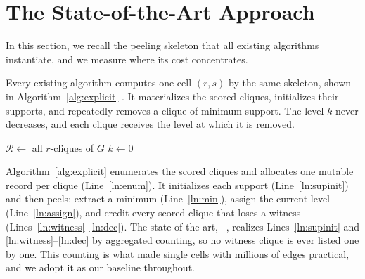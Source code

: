 \section{The State-of-the-Art Approach}\label{sec:existing}
In this section, we recall the peeling skeleton that all existing algorithms instantiate, and we measure where its cost concentrates.

Every existing algorithm computes one cell $(r,s)$ by the same skeleton, shown in Algorithm~\ref{alg:explicit} \cite{firstNucleus,NuclearCD}.
%
It materializes the scored cliques, initializes their supports, and repeatedly removes a clique of minimum support.
%
The level $k$ never decreases, and each clique receives the level at which it is removed.

\begin{algorithm}[t]
\caption{The explicit peel of existing algorithms.}
\label{alg:explicit}
\algfontsize
{}
$\mathcal{R} \leftarrow$ all $r$-cliques of $G$\label{ln:enum}
$k \leftarrow 0$\;
\end{algorithm}

Algorithm~\ref{alg:explicit} enumerates the scored cliques and allocates one mutable record per clique (Line~\ref{ln:enum}).
%
It initializes each support (Line~\ref{ln:supinit}) and then peels: extract a minimum (Line~\ref{ln:min}), assign the current level (Line~\ref{ln:assign}), and credit every scored clique that loses a witness (Lines~\ref{ln:witness}--\ref{ln:dec}).
%
The state of the art, \cnd~\cite{NuclearCD}, realizes Lines~\ref{ln:supinit} and \ref{ln:witness}--\ref{ln:dec} by aggregated counting, so no witness clique is ever listed one by one.
%
This counting is what made single cells with millions of edges practical, and we adopt it as our baseline throughout.

